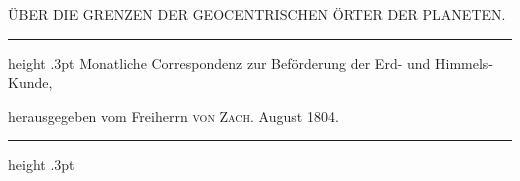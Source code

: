 \clearpage
\begingroup
\pagestyle{empty}
\thispagestyle{empty}
\noindent{}%
\par\vspace*{9mm}
\begin{center}\fontsize{10}{12}\selectfont ÜBER DIE GRENZEN DER GEOCENTRISCHEN ÖRTER DER PLANETEN.\end{center}
\begin{center}\parbox{.78\linewidth}{\centering\fontsize{8.6}{10.5}\selectfont\frenchspacing
\hrule height .3pt\relax\vspace{2.5pt}
Monatliche Correspondenz zur Beförderung der Erd- und Himmels-Kunde,\par
herausgegeben vom Freiherrn \textsc{von Zach}. August 1804.\par
\vspace{2.5pt}\hrule height .3pt\relax
}\end{center}

